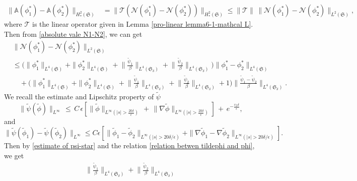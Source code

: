\documentclass[10pt, reqno]{amsart}
\numberwithin{equation}{section}
\theoremstyle{definition}
\def\lf{\left}
\def\ri{\right}
\begin{document}
{{\begin{align} \label{mathbb A1-mathbb A2}
\|\mathbb A (\phi^*_1) - \mathbb A (\phi^*_2)\|_{H^2_*(\mathfrak S)}&= \|{\mathcal T}\left( {\mathcal N}(\phi^*_1)- {\mathcal N}(\phi^*_2) \right) \|_{H^2_*(\mathfrak S)}
\leq
\|{\mathcal T}\|\, \|{\mathcal N}(\phi_1^*) - {\mathcal N}(\phi_2^*)\|_{L^2(\mathfrak S)},
\end{align} where $ {\mathcal T}$ is the linear operator given in Lemma \ref{pro-linear lemma6-1-mathcal L}.
Then from \eqref{absolute vale N1-N2}, we can get
\begin{align} \label{mathcal N1-mathcal N2}
& \|{\mathcal N}(\phi_1^*) - {\mathcal N}(\phi_2^*)\|_{L^2(\mathfrak S)}
\nonumber\\[2mm]
 & \leq \Big(\|\phi_1^*\|_{L^4(\mathfrak S)}+ \|\phi_2^*\|_{L^4(\mathfrak S)}
 + \Big\|\frac{{\tilde\psi}_1}{\beta} \Big\|_{L^4(\mathfrak S_\delta)}
 + \Big\|\frac{{\tilde\psi}_2}{\beta} \Big\|_{L^4(\mathfrak S_\delta)}\Big) \|\phi_1^*- \phi_2^*\|_{L^4(\mathfrak S)}
\nonumber
 \\[2mm]
 & \quad + \Big(\|\phi_1^*\|_{L^4(\mathfrak S)}+ \|\phi_2^*\|_{L^4(\mathfrak S)}
 + \Big\|\frac{{\tilde\psi}_1}{\beta} \Big\|_{L^4(\mathfrak S_\delta)}
 +  \Big\|\frac{{\tilde\psi}_2}{\beta} \Big\|_{L^4(\mathfrak S_\delta)} +1\Big)
  \Big\|\frac{{\tilde\psi}_1- {\tilde\psi}_2}{\beta} \Big\|_{L^4(\mathfrak S_\delta)}.
\end{align}
 We recall the estimate and Lipschitz property of $\tilde\psi$
\begin{equation} \label{estimate of psi-star}
\|{\tilde\psi}({\tilde\phi})\|_{L^{\infty}}
\,\leq \,
C\, \epsilon \lf[\|\tilde\phi\|_{L^{\infty}(|s|>\frac{20\delta}{\epsilon})}
\,+\, \|\nabla \tilde\phi\|_{L^{\infty}(|s|>\frac{20\delta}{\epsilon})}\ri]
\,+\,
e^{-\frac{ \upsilon_2 \delta}{\epsilon}},
\end{equation}
and
\begin{equation}\label{estimeta of psistar12}
\|{\tilde\psi}(\tilde\phi_1)-{\tilde\psi}(\tilde\phi_2)\|_{L^{\infty}}
\leq
C\epsilon \lf[ \|\tilde\phi_1-\tilde\phi_2\|_{L^{\infty}(|s|>{20\delta}/\epsilon)}+\|\nabla\tilde\phi_1-\nabla\tilde\phi_2\|_{L^{\infty}(|s|>
{20\delta}/\epsilon)}\ri].
\end{equation}
Then by \eqref{estimate of psi-star} and the relation \eqref{relation betwen tildephi and phi}}, we get
\begin{align}\label{estimate tilde psi1 tilde psi 2 L4}
\Big\|\frac{{\tilde\psi}_1}{\beta}\Big\|_{L^4(\mathfrak S_\delta)}
+\Big\|\frac{{\tilde\psi}_2}{\beta}\Big\|_{L^4(\mathfrak S_\delta)}

\end{align}}
\end{document}
